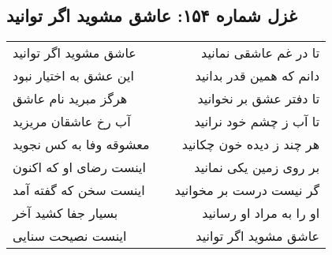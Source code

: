 \begin{center}
\section*{غزل شماره ۱۵۴: عاشق مشوید اگر توانید}
\label{sec:154}
\begin{longtable}{l p{0.5cm} r}
عاشق مشوید اگر توانید
&&
تا در غم عاشقی نمانید
\\
این عشق به اختیار نبود
&&
دانم که همین قدر بدانید
\\
هرگز مبرید نام عاشق
&&
تا دفتر عشق بر نخوانید
\\
آب رخ عاشقان مریزید
&&
تا آب ز چشم خود نرانید
\\
معشوقه وفا به کس نجوید
&&
هر چند ز دیده خون چکانید
\\
اینست رضای او که اکنون
&&
بر روی زمین یکی نمانید
\\
اینست سخن که گفته آمد
&&
گر نیست درست بر مخوانید
\\
بسیار جفا کشید آخر
&&
او را به مراد او رسانید
\\
اینست نصیحت سنایی
&&
عاشق مشوید اگر توانید
\\
\end{longtable}
\end{center}
